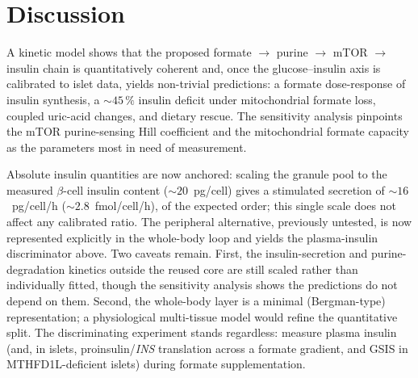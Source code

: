\documentclass[10pt,letterpaper]{article}
\begin{document}
\section*{Discussion}
A kinetic model shows that the proposed formate $\rightarrow$ purine
$\rightarrow$ mTOR $\rightarrow$ insulin chain is quantitatively coherent and,
once the glucose--insulin axis is calibrated to islet data, yields non-trivial
predictions: a formate dose-response of insulin synthesis, a ${\sim}45\,\%$
insulin deficit under mitochondrial formate loss, coupled uric-acid changes, and
dietary rescue. The sensitivity analysis pinpoints the mTOR purine-sensing Hill
coefficient and the mitochondrial formate capacity as the parameters most in
need of measurement.

Absolute insulin quantities are now anchored: scaling the granule pool to the
measured $\beta$-cell insulin content (${\sim}20$~pg/cell) gives a stimulated
secretion of ${\sim}16$~pg/cell/h (${\sim}2.8$~fmol/cell/h), of the expected
order; this single scale does not affect any calibrated ratio. The peripheral
alternative, previously untested, is now represented explicitly in the
whole-body loop and yields the plasma-insulin discriminator above. Two caveats
remain. First, the insulin-secretion and purine-degradation kinetics outside the
reused core are still scaled rather than individually fitted, though the
sensitivity analysis shows the predictions do not depend on them. Second, the
whole-body layer is a minimal (Bergman-type) representation; a physiological
multi-tissue model would refine the quantitative split. The discriminating
experiment stands regardless: measure plasma insulin (and, in islets,
proinsulin/\textit{INS} translation across a formate gradient, and GSIS in
MTHFD1L-deficient islets) during formate supplementation.
\end{document}
